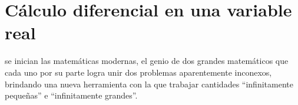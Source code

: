 \chapter{Cálculo diferencial en una variable real} %
\label{cha:calculo_diferencial_de_una_variable_real}

\noindent {} se
inician las matemáticas modernas, el genio de dos grandes matemáticos que cada
uno por su parte logra unir dos problemas aparentemente inconexos, brindando
una nueva herramienta con la que trabajar cantidades ``infinitamente
pequeñas'' e ``infinitamente grandes''. 



